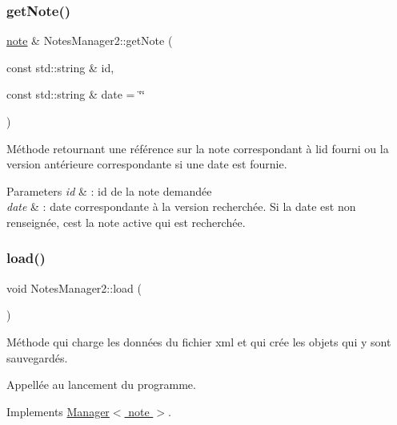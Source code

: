 \subsubsection{\texorpdfstring{get\+Note()}{getNote()}}
{\footnotesize\ttfamily \hyperlink{classnote}{note} \& Notes\+Manager2\+::get\+Note (\begin{DoxyParamCaption}\item[{const std\+::string \&}]{id,  }\item[{const std\+::string \&}]{date = {\ttfamily \char`\"{}\char`\"{}} }\end{DoxyParamCaption})}



Méthode retournant une référence sur la note correspondant à l\textquotesingle{}id fourni ou la version antérieure correspondante si une date est fournie. 


\begin{DoxyParams}{Parameters}
{\em id} & \+: id de la note demandée \\
\hline
{\em date} & \+: date correspondante à la version recherchée. Si la date est non renseignée, c\textquotesingle{}est la note active qui est recherchée. \\
\hline
\end{DoxyParams}
\mbox{\label{class_notes_manager2_a2248b5b1620b2039fdba9b3c6476c6cc}} 
\subsubsection{\texorpdfstring{load()}{load()}}
{\footnotesize\ttfamily void Notes\+Manager2\+::load (\begin{DoxyParamCaption}{ }\end{DoxyParamCaption})\hspace{0.3cm}{\ttfamily [virtual]}}



Méthode qui charge les données du fichier xml et qui crée les objets qui y sont sauvegardés. 

Appellée au lancement du programme. 

Implements \hyperlink{class_manager_add6a6361b3ebef4e6e744c2b12f9e57d}{Manager$<$ note $>$}.

\mbox{\label{class_notes_manager2_a03224a8a150d7d7a40a6633ab2afc7c0}} 
